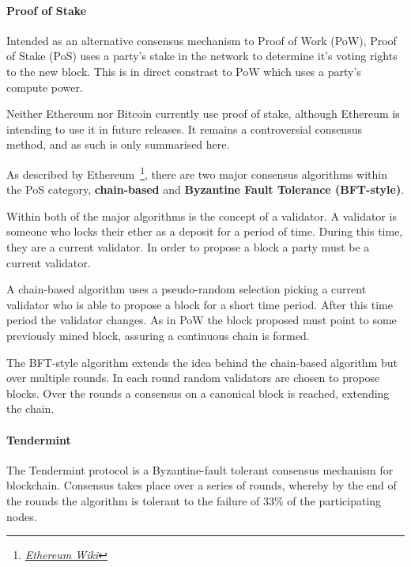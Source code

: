 \paragraph{Proof of Stake}

Intended as an alternative consensus mechanism to Proof of Work (PoW), Proof of Stake (PoS) uses a party's stake in the network to determine it's voting rights to the new block. This is in direct constrast to PoW which uses a party's compute power.

Neither Ethereum nor Bitcoin currently use proof of stake, although Ethereum is intending to use it in future releases. It remains a controversial consensus method, and as such is only summarised here.

As described by Ethereum~\footnote{\href{https://github.com/ethereum/wiki/wiki}{\textit{Ethereum Wiki}}}, there are two major consensus algorithms within the PoS category, \textbf{chain-based} and \textbf{Byzantine Fault Tolerance (BFT-style)}.

Within both of the major algorithms is the concept of a validator. A validator is someone who locks their ether as a deposit for a period of time. During this time, they are a current validator. In order to propose a block a party must be a current validator.

A chain-based algorithm uses a pseudo-random selection picking a current validator who is able to propose a block for a short time period. After this time period the validator changes. As in PoW the block proposed must point to some previously mined block, assuring a continuous chain is formed.

The BFT-style algorithm extends the idea behind the chain-based algorithm but over multiple rounds. In each round random validators are chosen to propose blocks. Over the rounds a consensus on a canonical block is reached, extending the chain.

\paragraph{Tendermint}

The Tendermint protocol is a Byzantine-fault tolerant consensus mechanism for blockchain. Consensus takes place over a series of rounds, whereby by the end of the rounds the algorithm is tolerant to the failure of 33\% of the participating nodes.

